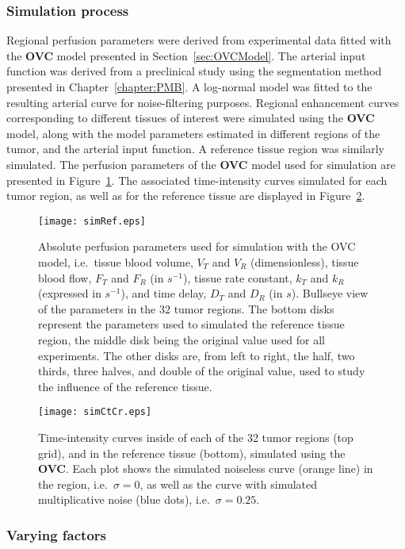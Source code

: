 \subsubsection{Simulation process}
Regional perfusion parameters were derived from experimental data fitted with the \textbf{OVC} model presented in Section~\ref{sec:OVCModel}.
The arterial input function was derived from a preclinical study using the segmentation method presented in Chapter~\ref{chapter:PMB}.
A log-normal model was fitted to the resulting arterial curve for noise-filtering purposes. 
Regional enhancement curves corresponding to different tissues of interest were simulated using the \textbf{OVC} model, along with the model parameters estimated in different regions of the tumor, and the arterial input function.
A reference tissue region was similarly simulated.
The perfusion parameters of the \textbf{OVC} model used for simulation are presented in Figure~\ref{fig:simRef}.
The associated time-intensity curves simulated for each tumor region, as well as for the reference tissue are displayed in Figure~\ref{fig:simCtCr}.

\begin{figure}[bh]
\texttt{[image: simRef.eps]}
\caption{Absolute perfusion parameters used for simulation with the OVC model, i.e.~tissue blood volume, $V_T$ and $V_R$ (dimensionless), tissue blood flow, $F_T$ and $F_R$ (in $s^{-1}$), tissue rate constant, $k_T$ and $k_R$ (expressed in $s^{-1}$), and time delay, $D_T$ and $D_R$ (in $s$). Bullseye view of the parameters in the 32 tumor regions. The bottom disks represent the parameters used to simulated the reference tissue region, the middle disk being the original value used for all experiments. The other disks are, from left to right, the half, two thirds, three halves, and double of the original value, used to study the influence of the reference tissue.}
\label{fig:simRef}
\end{figure}

\begin{figure}
\texttt{[image: simCtCr.eps]}
\caption{Time-intensity curves inside of each of the 32 tumor regions (top grid), and in the reference tissue (bottom), simulated using the \textbf{OVC}. Each plot shows the simulated noiseless curve (orange line) in the region, i.e.~$\sigma = 0$, as well as the curve with simulated multiplicative noise (blue dots), i.e.~$\sigma = 0.25$.}
\label{fig:simCtCr}
\end{figure}

\subsubsection{Varying factors}
